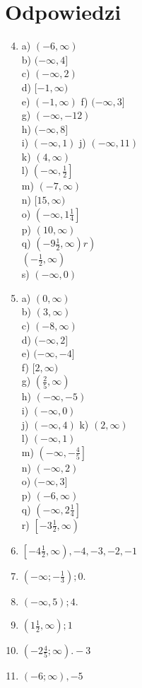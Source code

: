 \documentclass[10pt]{article}
\begin{document}
\section*{Odpowiedzi}
\begin{enumerate}
  \setcounter{enumi}{3}
  \item a) \((-6, \infty)\)\\
b) \((-\infty, 4]\)\\
c) \((-\infty, 2)\)\\
d) \([-1, \infty)\)\\
e) \((-1, \infty)\) f) \((-\infty, 3]\)\\
g) \((-\infty,-12)\)\\
h) \((-\infty, 8]\)\\
i) \((-\infty, 1)\) j) \((-\infty, 11)\)\\
k) \((4, \infty)\)\\
l) \(\left(-\infty, \frac{1}{2}\right]\)\\
m) \((-7, \infty)\)\\
n) \([15, \infty)\)\\
o) \(\left(-\infty, 1 \frac{1}{4}\right]\)\\
p) \((10, \infty)\)\\
q) \(\left.\left(-9 \frac{1}{2}, \infty\right) r\right)\)\\
\(\left(-\frac{1}{2}, \infty\right)\)\\
s) \((-\infty, 0)\)
  \item a) \((0, \infty)\)\\
b) \((3, \infty)\)\\
c) \((-8, \infty)\)\\
d) \((-\infty, 2]\)\\
e) \((-\infty,-4]\)\\
f) \([2, \infty)\)\\
g) \(\left(\frac{2}{5}, \infty\right)\)\\
h) \((-\infty,-5)\)\\
i) \((-\infty, 0)\)\\
j) \((-\infty, 4)\) k) \((2, \infty)\)\\
l) \((-\infty, 1)\)\\
m) \(\left(-\infty,-\frac{4}{5}\right]\)\\
n) \((-\infty, 2)\)\\
o) \((-\infty, 3]\)\\
p) \((-6, \infty)\)\\
q) \(\left(-\infty, 2 \frac{1}{4}\right]\)\\
r) \(\left[-3 \frac{1}{2}, \infty\right)\)
  \item \(\left[-4 \frac{1}{2}, \infty\right),-4,-3,-2,-1\)
  \item \(\left(-\infty ;-\frac{1}{3}\right) ; 0\).
  \item \((-\infty, 5) ; 4\).
  \item \(\left(1 \frac{1}{2}, \infty\right) ; 1\)
  \item \(\left(-2 \frac{4}{5} ; \infty\right) .-3\)
  \item \((-6 ; \infty),-5\)
\end{enumerate}
\end{document}

